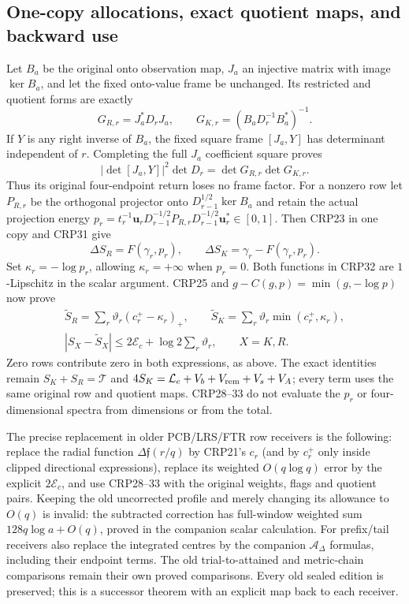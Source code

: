 \documentclass[11pt,a4paper]{article}
\begin{document}
\subsection{One-copy allocations, exact quotient maps, and backward use}
Let $B_a$ be the original onto observation map, $J_a$ an injective
matrix with image $\ker B_a$, and let the fixed onto-value frame be
unchanged. Its restricted and quotient forms are exactly
\[
G_{R,r}=J_a^*D_rJ_a,\qquad
G_{K,r}=(B_aD_r^{-1}B_a^*)^{-1}.\tag{CRP30}
\]
If $Y$ is any right inverse of $B_a$, the fixed square frame
$[J_a,Y]$ has determinant independent of $r$. Completing the full
$J_a$ coefficient square proves
\[
|\det[J_a,Y]|^2\det D_r=\det G_{R,r}\det G_{K,r}.
\tag{CRP31}
\]
Thus its original four-endpoint return loses no frame factor.
For a nonzero row let $P_{R,r}$ be the orthogonal projector onto
$D_{r-1}^{1/2}\ker B_a$ and retain the actual projection energy
$p_r=t_r^{-1}\mathbf u_rD_{r-1}^{-1/2}P_{R,r}
D_{r-1}^{-1/2}\mathbf u_r^*\in[0,1]$.
Then CRP23 in one copy and CRP31 give
\[
\Delta S_R=F(\gamma_r,p_r),\qquad
\Delta S_K=\gamma_r-F(\gamma_r,p_r).\tag{CRP32}
\]
Set $\kappa_r=-\log p_r$, allowing $\kappa_r=+\infty$ when $p_r=0$.
Both functions in CRP32 are $1$-Lipschitz in the scalar argument.
CRP25 and $g-C(g,p)=\min(g,-\log p)$ now prove
\[
\begin{gathered}
\widetilde S_R=\sum_r\vartheta_r(c_r^+-\kappa_r)_+,\qquad
\widetilde S_K=\sum_r\vartheta_r\min(c_r^+,\kappa_r),\\
\boxed{|S_X-\widetilde S_X|\le2\mathcal E_c+
 \log2\sum_r\vartheta_r,\qquad X=K,R.}\tag{CRP33}
\end{gathered}
\]
Zero rows contribute zero in both expressions, as above. The exact
identities remain $S_K+S_R=\mathcal T$ and
$4S_K=\mathcal L_e+V_b+V_{\rm rem}+V_s+V_A$; every term uses the same
original row and quotient maps. CRP28--33 do not evaluate the
$p_r$ or four-dimensional spectra from dimensions or from the total.

The precise replacement in older PCB/LRS/FTR row receivers is the
following: replace the radial function $\Delta\mathfrak f(r/q)$
by CRP21's $c_r$ (and by $c_r^+$ only inside clipped directional
expressions), replace its weighted $O(q\log q)$ error by the
explicit $2\mathcal E_c$, and use CRP28--33 with the original
weights, flags and quotient pairs. Keeping the old uncorrected
profile and merely changing its allowance to $O(q)$ is invalid:
the subtracted correction has full-window weighted sum
$128q\log a+O(q)$, proved in the companion scalar calculation.
For prefix/tail receivers also replace the integrated centres by
the companion $\mathcal A_\Delta$ formulas, including their endpoint
terms. The old trial-to-attained and metric-chain comparisons remain
their own proved comparisons. Every old sealed edition is preserved;
this is a successor theorem with an explicit map back to each receiver.
\endgroup
\end{document}
